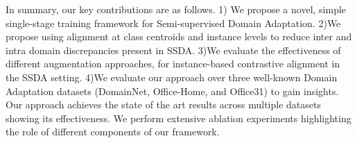  In summary, our key contributions are as follows.
1) We propose a novel, simple single-stage training framework for Semi-supervised Domain Adaptation.
2)We propose using alignment at class centroids and instance levels to reduce inter and intra domain discrepancies present in SSDA.
3)We evaluate the effectiveness of different augmentation approaches, for instance-based contrastive alignment in the SSDA setting.
 4)We evaluate our approach over three well-known Domain Adaptation datasets (DomainNet, Office-Home, and Office31) to gain insights. Our approach achieves the state of the art results across multiple datasets showing its effectiveness. We perform extensive ablation experiments highlighting the role of different components of our framework.